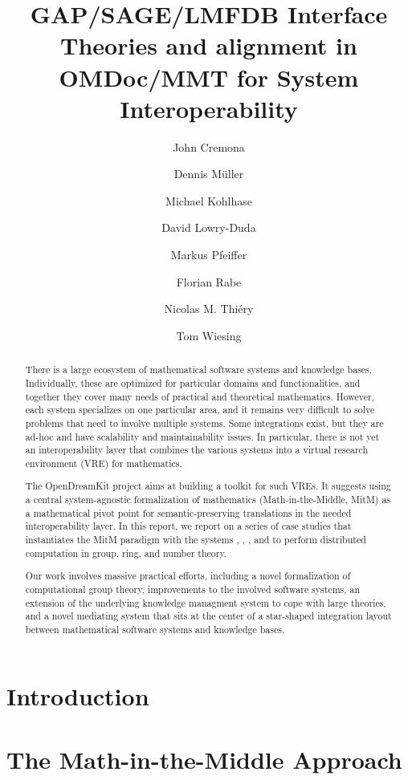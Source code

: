 \documentclass[book]{deliverablereport}
\title{GAP/SAGE/LMFDB Interface Theories and alignment in OMDoc/MMT for System Interoperability}
\author{John Cremona}
\author{Dennis M\"uller}
\author{Michael Kohlhase}
\author{David Lowry-Duda}
\author{Markus Pfeiffer}
\author{Florian Rabe}
\author{Nicolas M. Thiéry}
\author{Tom Wiesing}
\def\papertype{report\xspace}
\begin{document}
\begin{abstract}
  There is a large ecosystem of mathematical software systems and knowledge bases.
  Individually, these are optimized for particular domains and functionalities, and
  together they cover many needs of practical and theoretical mathematics.  However, each
  system specializes on one particular area, and it remains very difficult to solve
  problems that need to involve multiple systems.  Some integrations exist, but they are
  ad-hoc and have scalability and maintainability issues.  In particular, there is not yet
  an interoperability layer that combines the various systems into a virtual research
  environment (VRE) for mathematics.
  
  The OpenDreamKit project aims at building a toolkit for such VREs.  It suggests using a
  central system-agnostic formalization of mathematics (Math-in-the-Middle, MitM) as a
  mathematical pivot point for semantic-preserving translations in the needed
  interoperability layer.  In this \papertype, we report on a series of case studies that
  instantiates the MitM paradigm with the systems \GAP, \Sage, \LMFDB, and
  \Singular{} to perform distributed computation in group,
  ring, and number theory.
 
  Our work involves massive practical efforts, including a novel formalization of
  computational group theory, improvements to the involved software systems, an extension
  of the underlying knowledge managment system to cope with large theories, and a novel
  mediating system that sits at the center of a star-shaped integration layout between
  mathematical software systems and knowledge bases.
\end{abstract}

\maketitle
\setcounter{tocdepth}{2}
\newpage\tableofcontents\newpage
{}

\section{Introduction}\label{sec:intro}


\section[Math-in-the-Middle]{The Math-in-the-Middle Approach}\label{sec:mitm}

\end{document}

